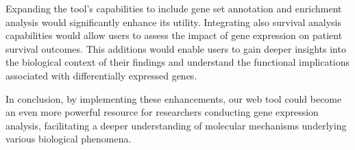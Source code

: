 \documentclass[
	a4paper, %
	10pt, %
	unnumberedsections, %
	twoside, %
]{LTJournalArticle}
\begin{document}
Expanding the tool's capabilities to include gene set annotation and enrichment analysis would significantly enhance its utility. Integrating also survival analysis capabilities would allow users to assess the impact of gene expression on patient survival outcomes. This additions would enable users to gain deeper insights into the biological context of their findings and understand the functional implications associated with differentially expressed genes.

In conclusion, by implementing these enhancements, our web tool could become an even more powerful resource for researchers conducting gene expression analysis, facilitating a deeper understanding of molecular mechanisms underlying various biological phenomena.




\printbibliography %

\end{document}
